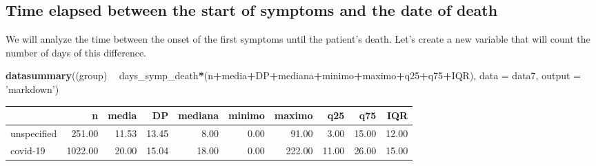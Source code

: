 \documentclass[
]{article}
\newenvironment{Shaded}{\begin{snugshade}}{\end{snugshade}}
\newcommand{\CommentTok}[1]{\textcolor[rgb]{0.56,0.35,0.01}{\textit{#1}}}
\newcommand{\DataTypeTok}[1]{\textcolor[rgb]{0.13,0.29,0.53}{#1}}
\newcommand{\KeywordTok}[1]{\textcolor[rgb]{0.13,0.29,0.53}{\textbf{#1}}}
\newcommand{\NormalTok}[1]{#1}
\newcommand{\OperatorTok}[1]{\textcolor[rgb]{0.81,0.36,0.00}{\textbf{#1}}}
\newcommand{\StringTok}[1]{\textcolor[rgb]{0.31,0.60,0.02}{#1}}
\begin{document}
\hypertarget{time-elapsed-between-the-start-of-symptoms-and-the-date-of-death}{%
\subsection{Time elapsed between the start of symptoms and the date of
death}\label{time-elapsed-between-the-start-of-symptoms-and-the-date-of-death}}

We will analyze the time between the onset of the first symptoms until
the patient's death. Let's create a new variable that will count the
number of days of this difference.

\begin{Shaded}
\end{Shaded}

\begin{Shaded}
\begin{Highlighting}[]
\KeywordTok{datasummary}\NormalTok{((group) }\OperatorTok{~}\StringTok{ }\NormalTok{days_symp_death}\OperatorTok{*}\NormalTok{(n}\OperatorTok{+}\NormalTok{media}\OperatorTok{+}\NormalTok{DP}\OperatorTok{+}\NormalTok{mediana}\OperatorTok{+}\NormalTok{minimo}\OperatorTok{+}\NormalTok{maximo}\OperatorTok{+}\NormalTok{q25}\OperatorTok{+}\NormalTok{q75}\OperatorTok{+}\NormalTok{IQR),}
            \DataTypeTok{data =}\NormalTok{ data7, }\DataTypeTok{output =} \StringTok{'markdown'}\NormalTok{)}
\end{Highlighting}
\end{Shaded}

\begin{longtable}[]{@{}lrrrrrrrrr@{}}
\toprule
& n & media & DP & mediana & minimo & maximo & q25 & q75 &
IQR\tabularnewline
\midrule
\endhead
unspecified & 251.00 & 11.53 & 13.45 & 8.00 & 0.00 & 91.00 & 3.00 &
15.00 & 12.00\tabularnewline
covid-19 & 1022.00 & 20.00 & 15.04 & 18.00 & 0.00 & 222.00 & 11.00 &
26.00 & 15.00\tabularnewline
\bottomrule
\end{longtable}
\end{document}
